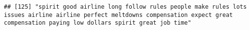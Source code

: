 \documentclass[
]{article}
\begin{document}
\begin{verbatim}
## [125] "spirit good airline long follow rules people make rules lots issues airline airline perfect meltdowns compensation expect great compensation paying low dollars spirit great job time"                                                                                                                                                                                                                                                                                                                                                                                                                                                                                                                                                                                                                                                                                                                                                                                                                                                                                                                                                                                                                                                                                                                                                                                                                                                                                                                                                                                                                                                                                                                                                                                                         

\end{verbatim}
\end{document}
